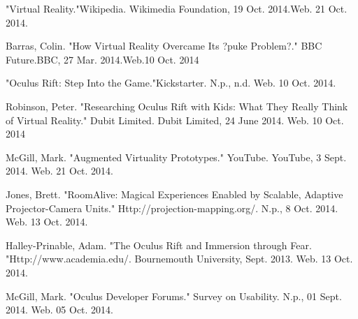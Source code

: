 \documentclass[a4paper]{article}
\begin{document}
\begin{thebibliography}{9}

"Virtual Reality."Wikipedia. Wikimedia Foundation, 19 Oct. 2014.Web. 21 Oct. 2014.

Barras, Colin.
"How Virtual Reality Overcame Its ?puke Problem?." BBC Future.BBC, 27 Mar. 2014.Web.10 Oct. 2014

"Oculus Rift: Step Into the Game."Kickstarter. N.p., n.d. Web. 10 Oct. 2014.
  
Robinson, Peter. "Researching Oculus Rift with Kids: What They Really Think of Virtual Reality." Dubit Limited. Dubit Limited, 24 June 2014. Web. 10 Oct. 2014

 McGill, Mark. "Augmented Virtuality Prototypes." YouTube. YouTube, 3 Sept. 2014. Web. 21 Oct. 2014.
 
Jones, Brett. "RoomAlive: Magical Experiences Enabled by Scalable, Adaptive Projector-Camera Units." Http://projection-mapping.org/. N.p., 8 Oct. 2014. Web. 13 Oct. 2014.

Halley-Prinable, Adam. "The Oculus Rift and Immersion through Fear. "Http://www.academia.edu/. Bournemouth University, Sept. 2013. Web. 13 Oct. 2014.  
  
McGill, Mark. "Oculus Developer Forums." Survey on Usability. N.p., 01 Sept. 2014. Web. 05 Oct. 2014.  

\end{thebibliography}
\end{document}
